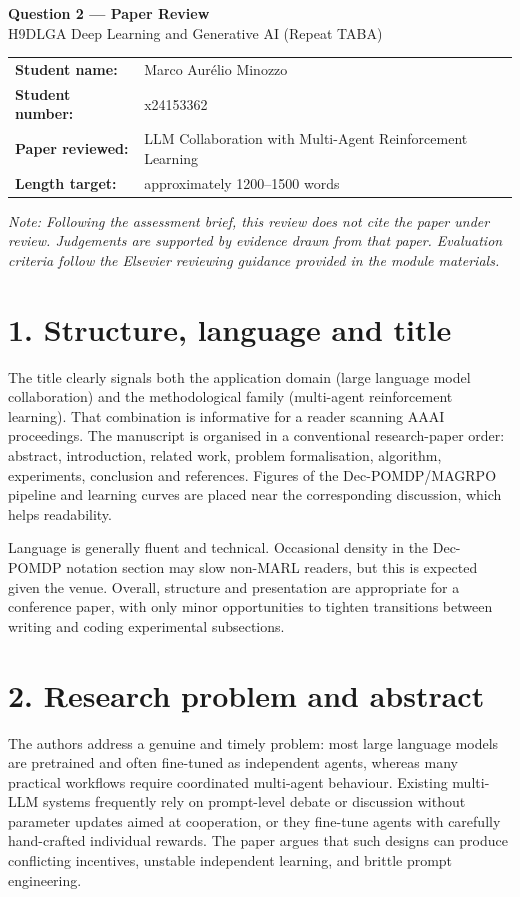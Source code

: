 \documentclass[11pt,a4paper]{article}
\begin{document}
\begin{center}
{\Large\textbf{Question 2 --- Paper Review}}\\[0.5em]
{\large H9DLGA Deep Learning and Generative AI (Repeat TABA)}\\[1em]
\begin{tabular}{ll}
\textbf{Student name:} & Marco Aur\'{e}lio Minozzo \\
\textbf{Student number:} & x24153362 \\
\textbf{Paper reviewed:} & LLM Collaboration with Multi-Agent Reinforcement Learning \\
\textbf{Length target:} & approximately 1200--1500 words \\
\end{tabular}
\end{center}

\vspace{1em}
\noindent\textit{Note: Following the assessment brief, this review does not cite the paper under review. Judgements are supported by evidence drawn from that paper. Evaluation criteria follow the Elsevier reviewing guidance provided in the module materials.}

\section*{1. Structure, language and title}
The title clearly signals both the application domain (large language model collaboration) and the methodological family (multi-agent reinforcement learning). That combination is informative for a reader scanning AAAI proceedings. The manuscript is organised in a conventional research-paper order: abstract, introduction, related work, problem formalisation, algorithm, experiments, conclusion and references. Figures of the Dec-POMDP/MAGRPO pipeline and learning curves are placed near the corresponding discussion, which helps readability.

Language is generally fluent and technical. Occasional density in the Dec-POMDP notation section may slow non-MARL readers, but this is expected given the venue. Overall, structure and presentation are appropriate for a conference paper, with only minor opportunities to tighten transitions between writing and coding experimental subsections.

\section*{2. Research problem and abstract}
The authors address a genuine and timely problem: most large language models are pretrained and often fine-tuned as independent agents, whereas many practical workflows require coordinated multi-agent behaviour. Existing multi-LLM systems frequently rely on prompt-level debate or discussion without parameter updates aimed at cooperation, or they fine-tune agents with carefully hand-crafted individual rewards. The paper argues that such designs can produce conflicting incentives, unstable independent learning, and brittle prompt engineering.
\end{document}
